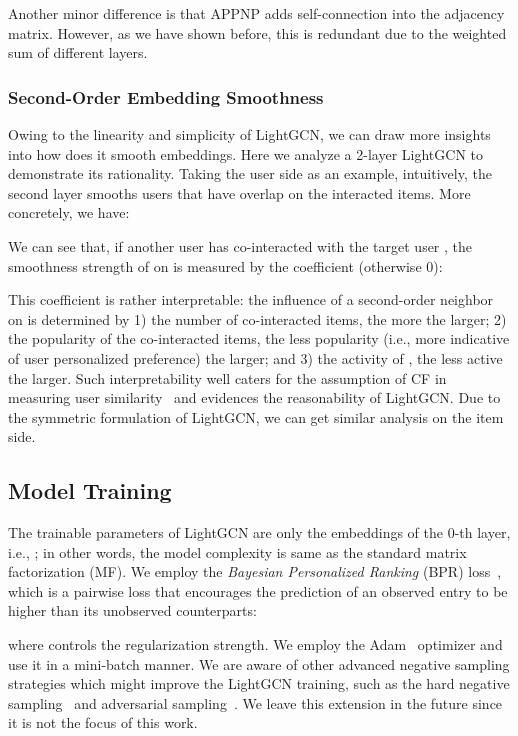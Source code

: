 \documentclass[sigconf]{acmart}
\theoremstyle{definition}
\begin{document}
Another minor difference is that APPNP adds self-connection into the adjacency matrix. However, as we have shown before, this is redundant due to the weighted sum of different layers. 

\subsubsection{Second-Order Embedding Smoothness} \label{ss:second-order}
Owing to the linearity and simplicity of LightGCN, we can draw more insights into how does it smooth embeddings. Here we analyze a 2-layer LightGCN to demonstrate its rationality. Taking the user side as an example, intuitively, the second layer smooths users that have overlap on the interacted items. More concretely, we have:

We can see that, if another user  has co-interacted with the target user , the smoothness strength of  on  is measured by the coefficient (otherwise 0):

This coefficient is rather interpretable: the influence of a second-order neighbor  on  is determined by 1) the number of co-interacted items, the more the larger; 2) the popularity of the co-interacted items, the less popularity (i.e., more indicative of user personalized preference) the larger; and 3) the activity of , the less active the larger. 
Such interpretability well caters for the assumption of CF in measuring user similarity~\cite{CSE,Wang:2006} and evidences the reasonability of LightGCN. 
Due to the symmetric formulation of LightGCN, we can get similar analysis on the item side. 

\subsection{Model Training}
The trainable parameters of LightGCN are only the embeddings of the 0-th layer, i.e.,  ; in other words, the model complexity is same as the standard matrix factorization (MF).
We employ the \textit{Bayesian Personalized Ranking} (BPR) loss~\cite{BPRMF}, which is a pairwise loss that encourages the prediction of an observed entry to be higher than its unobserved counterparts:

where  controls the  regularization strength. We employ the Adam~\cite{Adam} optimizer and use it in a mini-batch manner.
We are aware of other advanced negative sampling strategies which might improve the LightGCN training, such as the hard negative sampling~\cite{rendle2014improving} and adversarial sampling~\cite{Ding2019IJCAI}. We leave this extension in the future since it is not the focus of this work. 
\end{document}
